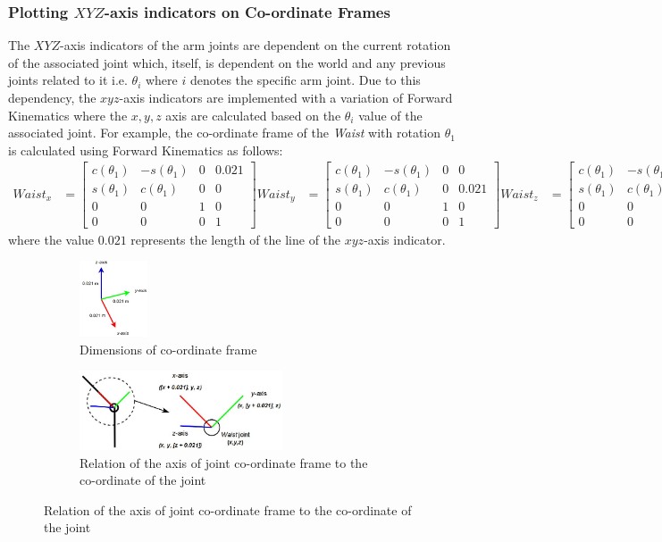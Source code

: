 \documentclass[9pt, a4paper]{article}
\begin{document}
\subsubsection{Plotting $XYZ$-axis indicators on Co-ordinate Frames}
The $XYZ$-axis indicators of the arm joints are dependent on the current
rotation of the associated joint which, itself, is dependent on the world and any
previous joints related to it i.e. $\theta_i$
where $i$ denotes the specific arm joint. Due to this dependency, the
$xyz$-axis indicators are implemented with a variation of Forward Kinematics where
the $x,y,z$ axis are calculated based on the $\theta_i$ value of the associated
joint. For example, the co-ordinate frame of the \textit{Waist} with rotation $\theta_1$ is calculated
using Forward Kinematics as follows:
{\small
\begin{align*}
  Waist_x &= \begin{bmatrix}
    c(\theta_1) & -s(\theta_1) & 0 & 0.021 \\ 
    s(\theta_1) & c(\theta_1)  & 0 & 0     \\ 
    0 & 0 & 1 & 0 \\ 
    0 & 0 & 0 & 1
  \end{bmatrix} 
  Waist_y &= \begin{bmatrix}
    c(\theta_1) & -s(\theta_1) & 0 & 0 \\ 
    s(\theta_1) & c(\theta_1)  & 0 & 0.021 \\ 
    0 & 0 & 1 & 0 \\ 
    0 & 0 & 0 & 1
  \end{bmatrix} 
  Waist_z &= \begin{bmatrix}
    c(\theta_1) & -s(\theta_1) & 0 & 0 \\ 
    s(\theta_1) & c(\theta_1)  & 0 & 0 \\ 
    0 & 0 & 1 & 0.021 \\ 
    0 & 0 & 0 & 1
  \end{bmatrix} 
\end{align*}
}%
where the value $0.021$ represents the length of the line of the $xyz$-axis indicator.
\begin{figure}[h]
  \centering
  \begin{subfigure}{.5\textwidth}
    \centering
    \includegraphics[width=2cm]{frame.JPG}
    \caption{Dimensions of co-ordinate frame}
  \end{subfigure}%
  \begin{subfigure}{.5\textwidth}
    \centering
    \includegraphics[width=6cm]{joint frames.JPG}
    \caption{Relation of the axis of joint co-ordinate frame to the co-ordinate of the joint}
  \end{subfigure}
\end{figure}
\end{document}

